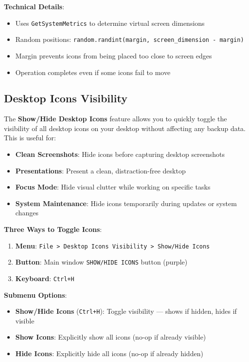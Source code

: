 \documentclass[a4paper,11pt]{article}
\begin{document}
\textbf{Technical Details}:
\begin{itemize}
  \item Uses \texttt{GetSystemMetrics} to determine virtual screen dimensions
  \item Random positions: \texttt{random.randint(margin,
    screen\_dimension - margin)}
  \item Margin prevents icons from being placed too close to screen edges
  \item Operation completes even if some icons fail to move
\end{itemize}

\subsection{Desktop Icons Visibility}
\label{sec:show-hide-icons}

The \textbf{Show/Hide Desktop Icons} feature allows you to quickly
toggle the visibility of all desktop icons on your desktop without
affecting any backup data. This is useful for:

\begin{itemize}
  \item \textbf{Clean Screenshots}: Hide icons before capturing
    desktop screenshots
  \item \textbf{Presentations}: Present a clean, distraction-free desktop
  \item \textbf{Focus Mode}: Hide visual clutter while working on specific tasks
  \item \textbf{System Maintenance}: Hide icons temporarily during
    updates or system changes
\end{itemize}

\textbf{Three Ways to Toggle Icons}:
\begin{enumerate}
  \item \textbf{Menu}: \texttt{File > Desktop Icons Visibility >
    Show/Hide Icons}
  \item \textbf{Button}: Main window \texttt{SHOW/HIDE ICONS} button (purple)
  \item \textbf{Keyboard}: \texttt{Ctrl+H}
\end{enumerate}

\textbf{Submenu Options}:
\begin{itemize}
  \item \textbf{Show/Hide Icons} (\texttt{Ctrl+H}): Toggle visibility
    --- shows if hidden, hides if visible
  \item \textbf{Show Icons}: Explicitly show all icons (no-op if
    already visible)
  \item \textbf{Hide Icons}: Explicitly hide all icons (no-op if already hidden)
\end{itemize}
\end{document}
